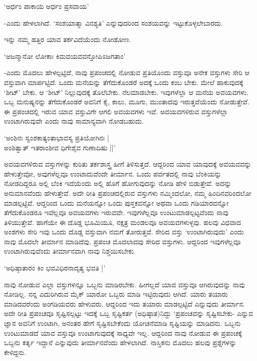 \begin{shloka}
`ಅರ್ಧಂ ಪಾಕಾಯ ಅರ್ಧಂ ಪ್ರಸವಾಯ'
\end{shloka}

-ಎಂದು ಹೇಳಲಾಗಿದೆ. `ಸಂಶಯಾತ್ಮಾ ವಿನಶ್ಯತಿ' ಎನ್ನುವುದರಿಂದ ಸಂಶಯವನ್ನು ಇಟ್ಟುಕೊಳ್ಳಲೇಬಾರದು.

ಇನ್ನು ನಮ್ಮ ಹತ್ತಿರ ಯಾವ ತರ್ಕವಿದೆಯೆಂದು ನೋಡೋಣ.

\begin{shloka}
`ಅಜನ್ಮಾನೋ ಲೋಕಾಃ ಕಿಮವಯವವನ್ತೋಪಿಽಜಗತಾಂ'
\end{shloka}

-ಎಂದು ಮೊದಲು ಹೇಳಲ್ಪಟ್ಟಿದೆ, ನಾವು ಪ್ರಪಂಚದಲ್ಲಿ ನೋಡುವ ಪ್ರತಿಯೊಂದು ವಸ್ತುವೂ ಅನೇಕ ವಸ್ತುಗಳು ಸೇರಿ ಆ ವಸ್ತುವಾಗಿ ಮಾರ್ಪಟ್ಟಿದೆ. ಒಂದು ಮನೆಯನ್ನು ತೆಗೆದುಕೊಂಡರೆ ಅದಕ್ಕೆ ಒಂದು ಕಂಬ ಬೇಕು. ಮೇಲೆ ಹಾಕುವುದಕ್ಕೆ `ಶೀಟ್' ಬೇಕು. ಆ `ಶೀಟ್' ನಿಲ್ಲುವುದಕ್ಕೆ ತೊಲೆಬೇಕು. ನೆಲಮಾಡಬೇಕು. ಇವುಗಳೆಲ್ಲಾ ಆ ಮನೆಯ ಅವಯವಗಳು. ಒಬ್ಬ ಮನುಷ್ಯನನ್ನು ತೆಗೆದುಕೊಂಡರೆ ಅವನಿಗೆ ಕೈ, ಕಾಲು, ಮೂಗು, ಮುಂತಾದವು ಇರುತ್ತವೆಯೆಂದು ನೋಡುತ್ತೇವೆ. ಈ ಪ್ರಪಂಚದಲ್ಲಿ ಇರುವ ಯಾವ ವಸ್ತುವಿಗೇ ಆಗಲಿ ಅವಯವಗಳು ಇವೆ. ಅವಯವಗಳಿರುವ ವಸ್ತುಗಳೆಲ್ಲಾ ಉಂಟಾಗಿರುವುವೇ ಎಂದು ನಾವು ಸಾಮಾನ್ಯವಾಗಿ ನೋಡಬಹುದು.

\begin{shloka}
`ಅಂಶಿನಃ ಸ್ವಂಶಕಾತ್ಯಂತಾಭಾವಸ್ಯ ಪ್ರತಿಯೋಗಿನಃ |\\
ಅಂಶಿತ್ವಾತ್ ಇತರಾಂಶೀವ ಧಿಗೇಶೈವ ಗುಣಾದಿಷು ||'
\end{shloka}

ಅವಯವಗಳಿರುವ ವಸ್ತುಗಳನ್ನು ಕುರಿತು ತರ್ಕಶಾಸ್ತ್ರ ಹೀಗೆ ತಿಳಿಸುತ್ತದೆ. ಆದ್ದರಿಂದ ಯಾವ ಯಾವುದಕ್ಕೆ ಅವಯವವನ್ನು ಹೇಳುತ್ತೇವೋ, ಅವುಗಳೆಲ್ಲವೂ ಉಂಟಾದುವೆಂದೇ ತೀರ್ಮಾನ. ಒಂದು ಪರ್ವತದಲ್ಲಿ ನಾವು ಬೆಂಕಿಯನ್ನು ನೋಡದಿದ್ದರೂ ಅಲ್ಲಿ ಬೆಂಕಿ ಇದೆಯೆಂದು ಅಲ್ಲಿ ಹೊಗೆ ಹೋಗುವುದನ್ನು ನೋಡಿ ಹೇಳಿ ಬಿಡುತ್ತೇವೆ. ಅದನ್ನು ಅನುಮಾನವೆಂದು ಹೇಳುತ್ತೇವೆ. ಅದೇ ರೀತಿ ಪ್ರಪಂಚದಲ್ಲಿರುವ ವಸ್ತುಗಳು ನಮ್ಮಿಂದಲೋ, ನಮ್ಮ ಹಿಂದಿನವರಿಂದಲೋ ಮಾಡಲ್ಪಟ್ಟಿವೆ. ಆದ್ದರಿಂದ ಒಂದು ಮನೆಯನ್ನೋ ಒಂದು ಪುಸ್ತಕವನ್ನೋ ಅಥವಾ ಒಂದು ಗಡಿಯಾರವನ್ನೋ ತೆಗೆದುಕೊಂಡರೂ ಇವೆಲ್ಲವೂ ಅವಯವಗಳು ಇರುವವೇ. ಇವುಗಳೆಲ್ಲವೂ ಉಂಟುಮಾಡಲ್ಪಟ್ಟವೆಂದು ನಾವು ತಿಳಿಯುತ್ತೇವೆ. ಹಾಗೆಯೇ ಈ ದೊಡ್ಡ ಭೂಮಿಯೂ, ನಕ್ಷತ್ರ ಮಂಡಲವೂ ಅವಯವಗಳುಳ್ಳವು. ಹಲವು ವಿಧವಾದ ಅಂಶಗಳು ಸೇರಿ ಇವು ಒಂದು ದೊಡ್ಡ ವಸ್ತುವಾಗಿ ನಮಗೆ ತೋರುತ್ತವೆ. ಸೇರಿದ ವಸ್ತು `ಉಂಟಾಗಿರುವುದು' ಎಂದು ನಾವು ಮೊದಲೇ ತೀರ್ಮಾನ ಮಾಡಿದೆವು. ಪ್ರಪಂಚ ಮೊದಲಾದವು ಸೇರಿದ ವಸ್ತುಗಳು. ಆದ್ದರಿಂದ ಇವುಗಳೆಲ್ಲವೂ ಉಂಟಾಗಿರುವುವೆಂದು ತೀರ್ಮಾನವಾಗಿ ನಾವು ನಿಶ್ಚಯಿಸಬೇಕು.

\begin{shloka}
`ಅಧಿಷ್ಠಾತಾರಂ ಕಿಂ ಭವವಿಧಿರನಾದೃತ್ಯ ಭವತಿ |'
\end{shloka}

ನಾವು ನೋಡುವ ಎಲ್ಲಾ ವಸ್ತುಗಳನ್ನೂ ಒಬ್ಬನು ಮಾಡಿರಬೇಕು. ಹೀಗಲ್ಲದೆ ಯಾವ ವಸ್ತುವೂ ಆಗಿರುವುದನ್ನು ನಾವು ನೋಡಿಲ್ಲ. ನನ್ನ ಎದುರಿಗಿರುವ ಮೈಕ್ ಯಾರೋ ಒಬ್ಬರು ಮಾಡಿ ಇಟ್ಟಿರುವುದು ಆಗಿದೆ. ಯಾರು ತಯಾರು ಮಾಡಿದವರೆಂದು ಅಂಗಡಿಯವರು ಹೇಳುವರು. ಆದ್ದರಿಂದ ಇದು ತಯಾರು ಮಾಡಲ್ಪಟ್ಟಿದೆ ಎನ್ನುವುದು ತೀರ್ಮಾನ. ಅದೇ ರೀತಿ ಪ್ರಪಂಚವೂ ಸೃಷ್ಟಿಸಲ್ಪಟ್ಟು ಇದಕ್ಕೆ ಒಬ್ಬ ಸೃಷ್ಟಿಕರ್ತ (ಅಧಿಷ್ಠಾತ)ನಿದ್ದು `ಪ್ರಪಂಚವನ್ನು ಸೃಷ್ಟಿಸಬೇಕು- ಎನ್ನುವ ಜ್ಞಾನ ಅವನಿಗೆ ಉಂಟಾಗಿ, ಅನಂತರ ಹೇಗೆ ಸೃಷ್ಟಿಸಬೇಕೆಂದು ಯೋಚನೆಮಾಡಿ ಸೃಷ್ಟಿಯನ್ನು ಮಾಡಿದನು. ಒಬ್ಬನು ಉಂಟುಮಾಡದೆ ಯಾವ ವಸ್ತುವೂ ಉಂಟಾಗುವುದಕ್ಕೆ ಸಾಧ್ಯವೇ ಇಲ್ಲ. ಆದ್ದರಿಂದ ನಾವು ನೋಡುವ ಈ ಪ್ರಪಂಚಕ್ಕೆ ಒಬ್ಬನು ಕರ್ತೃ ಇದ್ದಾನೆ ಎನ್ನುವುದು ತೀರ್ಮಾನವೆಂದು ಹೇಳಲಾಗಿದೆ. ನಾಸ್ತಿಕನು ಮೊದಲು ಹಲವು ಪ್ರಶ್ನೆಗಳನ್ನು ಕೇಳಿದ್ದನು.

